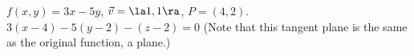 {$f(x,y) = 3x-5y$,  $\vec v = \la 1,1\ra$, $P=(4,2)$.
}
{
$3(x-4)-5(y-2) - (z-2) = 0$ (Note that this tangent plane is the same as the original function, a plane.)
}